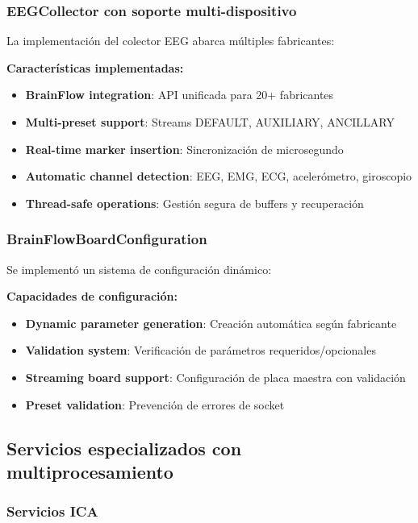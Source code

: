 \subsubsection{EEGCollector con soporte multi-dispositivo}

La implementación del colector EEG abarca múltiples fabricantes:

\textbf{Características implementadas:}
\begin{itemize}
    \item \textbf{BrainFlow integration}: API unificada para 20+ fabricantes
    \item \textbf{Multi-preset support}: Streams DEFAULT, AUXILIARY, ANCILLARY
    \item \textbf{Real-time marker insertion}: Sincronización de microsegundo
    \item \textbf{Automatic channel detection}: EEG, EMG, ECG, acelerómetro, giroscopio
    \item \textbf{Thread-safe operations}: Gestión segura de buffers y recuperación
\end{itemize}

\subsubsection{BrainFlowBoardConfiguration}

Se implementó un sistema de configuración dinámico:

\textbf{Capacidades de configuración:}
\begin{itemize}
    \item \textbf{Dynamic parameter generation}: Creación automática según fabricante
    \item \textbf{Validation system}: Verificación de parámetros requeridos/opcionales
    \item \textbf{Streaming board support}: Configuración de placa maestra con validación
    \item \textbf{Preset validation}: Prevención de errores de socket
\end{itemize}

\subsection{Servicios especializados con multiprocesamiento}
\label{subsec:servicios_multiproceso}

\subsubsection{Servicios ICA}

